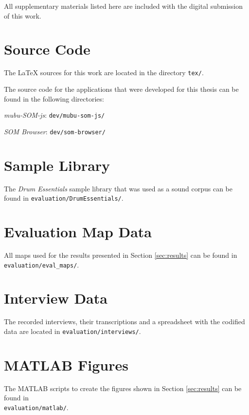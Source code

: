 
\begin{appendices}

All supplementary materials listed here are included with the digital
submission of this work.

\section{Source Code}

The {\LaTeX} sources for this work are located in the directory \texttt{tex/}.

\bigskip

\noindent
The source code for the applications that were developed for this thesis
can be found in the following directories:

\bigskip

\noindent
\textit{mubu-SOM-js}: \quad \texttt{dev/mubu-som-js/}

\bigskip

\noindent
\textit{SOM Browser}: \quad \texttt{dev/som-browser/}

\section{Sample Library}

The \textit{Drum Essentials} sample library that was used as a sound corpus can
be found in \texttt{evaluation/DrumEssentials/}.

\section{Evaluation Map Data}

All maps used for the results presented in Section \ref{sec:results} can be
found in \texttt{evaluation/eval\_maps/}.

\section{Interview Data}

The recorded interviews, their transcriptions and a spreadsheet with the
codified data are located in \texttt{evaluation/interviews/}.

\section{MATLAB Figures}

The MATLAB scripts to create the figures shown in Section \ref{sec:results} can
be found in\\ \texttt{evaluation/matlab/}.


\end{appendices}
